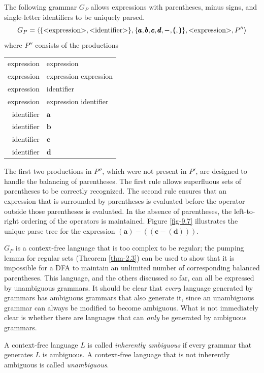 The following grammar $G_P$ allows expressions with parentheses, minus signs,
and single-letter identifiers to be uniquely parsed.
\[ G_P = \langle\{\text{\text{\textless}expression\text{\textgreater}},\text{\text{\textless}identifier\text{\textgreater}}\},\{\pmb{a},
	\pmb{b},\pmb{c},\pmb{d},\pmb{-},\pmb{(},\pmb{)}\},\text{\text{\textless}expression\text{\textgreater}},
	P''\rangle \]
where $P''$ consists of the productions
\begin{center}\begin{tabular}{r@{ $\rightarrow$ }l}
\<expression\> & \pmb{(}\<expression\>\pmb{)} \\
\<expression\> & \<expression\> \pmb{--} \pmb{(}\<expression\>\pmb{)} \\
\<expression\> & \<identifier\> \\
\<expression\> & \<expression\> \pmb{--} \<identifier\> \\
\<identifier\> & $\pmb{a}$ \\
\<identifier\> & $\pmb{b}$ \\
\<identifier\> & $\pmb{c}$ \\
\<identifier\> & $\pmb{d}$
\end{tabular}\end{center}

The first two productions in $P''$, which were not present in $P'$, are designed
to handle the balancing of parentheses. The first rule allows superfluous sets
of parentheses to be correctly recognized. The second rule ensures that an
expression that is surrounded by parentheses is evaluated before the operator
outside those parentheses is evaluated. In the absence of parentheses, the
left-to-right ordering of the operators is maintained. Figure \ref{fig-9.7} illustrates
the unique parse tree for the expression $\pmb{(a)-((c-(d)))}$.

$G_P$ is a context-free language that is too complex to be regular; the pumping
lemma for regular sets (Theorem \ref{thm-2.3}) can be used to show that it is impossible for
a DFA to maintain an unlimited number of corresponding balanced parentheses.
This language, and the others discussed so far, can all be expressed by
unambiguous grammars. It should be clear that \emph{every} language generated by
grammars has ambiguous grammars that also generate it, since an unambiguous
grammar can always be modified to become ambiguous. What is not immediately
clear is whether there are languages that can \emph{only} be generated by
ambiguous grammars.

\begin{dfn}\label{dfn-9.5}
A context-free language $L$ is called \emph{inherently ambiguous} if
every grammar that generates $L$ is ambiguous. A context-free language that is
not inherently ambiguous is called \emph{unambiguous}.
\end{dfn}

